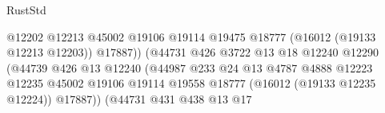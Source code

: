 \begin{lexlean}{RustStd}
\begin{coremodule}
                                                          @12202
                                                          @12213
                                                          @45002
                                                          @19106
                                                          @19114
                                                          @19475
                                                          @18777
                                                          (@16012 (@19133 @12213 @12203))
                                                          @17887))
                                                      (@44731
                                                        @426
                                                        @3722
                                                        @13
                                                        @18
                                                        @12240
                                                        @12290
                                                        (@44739
                                                          @426
                                                          @13
                                                          @12240
                                                          (@44987
                                                            @233
                                                            @24
                                                            @13
                                                            @4787
                                                            @4888
                                                            @12223
                                                            @12235
                                                            @45002
                                                            @19106
                                                            @19114
                                                            @19558
                                                            @18777
                                                            (@16012 (@19133 @12235 @12224))
                                                            @17887))
                                                        (@44731
                                                          @431
                                                          @438
                                                          @13
                                                          @17

\end{coremodule}
\end{lexlean}
